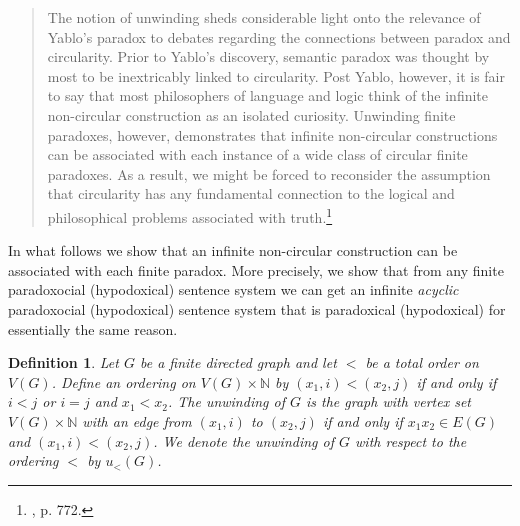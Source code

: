 \documentclass[12pt]{kluwer}
\newtheorem{defn}{Definition}
\theoremstyle{remark}
\begin{document}
\begin{quote}
The notion of unwinding sheds considerable light onto the relevance of Yablo's paradox to debates regarding the connections between paradox and circularity. Prior to Yablo's discovery, semantic paradox was thought by most to be inextricably linked to circularity.  Post Yablo, however, it is fair to say that most philosophers of language and logic think of the infinite non-circular construction as an isolated curiosity. Unwinding finite paradoxes, however, demonstrates that infinite non-circular constructions can be associated with each instance of a wide class of circular finite paradoxes. As a result, we might be forced to reconsider the assumption that circularity has any fundamental connection to the logical and philosophical problems associated with truth.\footnote{\cite{cook}, p. 772.}
\end{quote}

In what follows we show that an infinite non-circular construction can be associated with each finite paradox. More precisely, we show that from any finite paradoxocial (hypodoxical) sentence system we can get an infinite \textit{acyclic} paradoxocial (hypodoxical) sentence system that is paradoxical (hypodoxical) for essentially the same reason.

\begin{defn}
Let $G$ be a finite directed graph and let $<$ be a total order on $V(G)$.  Define an ordering on $V(G) \times \mathbb{N}$ by $(x_1, i) < (x_2, j)$ if and only if $i < j$ or $i = j$ and $x_1 < x_2$. The \emph{unwinding} of $G$ is the graph with vertex set $V(G) \times \mathbb{N}$ with an edge from $(x_1, i)$ to $(x_2, j)$ if and only if $x_1x_2 \in E(G)$ and $(x_1, i) < (x_2, j)$.  We denote the unwinding of $G$ with respect to the ordering $<$ by $u_{<}(G)$.
\end{defn}
\end{document}
